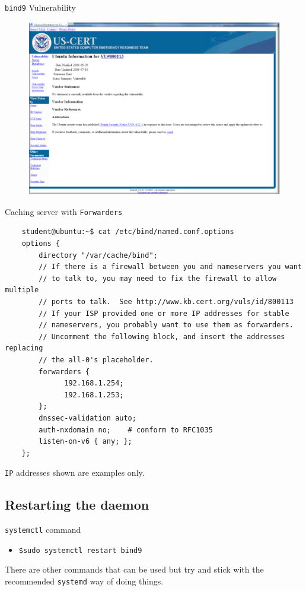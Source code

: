 \documentclass[aspectratio=169]{beamer}
\begin{document}
\begin{frame}{\texttt{bind9} Vulnerability}
  \begin{figure}
    \begin{center}
      \includegraphics[width=0.6\linewidth]{vulnerability.png}
    \end{center}
  \end{figure}
\end{frame}

\begin{frame}[fragile]{Caching server with \texttt{Forwarders}}
  \begin{lstlisting}
    student@ubuntu:~$ cat /etc/bind/named.conf.options
    options {
        directory "/var/cache/bind";
        // If there is a firewall between you and nameservers you want
        // to talk to, you may need to fix the firewall to allow multiple
        // ports to talk.  See http://www.kb.cert.org/vuls/id/800113
        // If your ISP provided one or more IP addresses for stable
        // nameservers, you probably want to use them as forwarders.
        // Uncomment the following block, and insert the addresses replacing
        // the all-0's placeholder.
        forwarders {
 		      192.168.1.254; 
		      192.168.1.253;
        };
        dnssec-validation auto;
        auth-nxdomain no;    # conform to RFC1035
        listen-on-v6 { any; };
    };
  \end{lstlisting}
  \begin{tcolorbox}[title={\textbf{NOTE:}}]
    \begin{center}
      \texttt{IP} addresses shown are examples only.      
    \end{center}
  \end{tcolorbox}
\end{frame}

\subsection{Restarting the daemon}
\begin{frame}{\texttt{systemctl} command}
  \begin{itemize}
    \item \texttt{\$sudo systemctl restart bind9}
  \end{itemize}
  \begin{tcolorbox}[title={\textbf{NOTE:}}]
    There are other commands that can be used but try and stick with the recommended \texttt{systemd} way of doing things.
  \end{tcolorbox} 
\end{frame}
\end{document}
